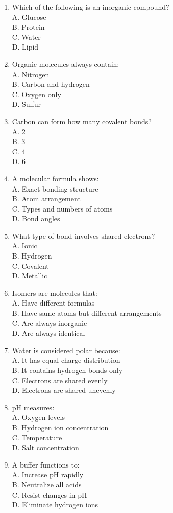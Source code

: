 \documentclass[
  letterpaper,
  DIV=11,
  numbers=noendperiod]{scrreprt}
\begin{document}
\begin{enumerate}
\def\labelenumi{\arabic{enumi}.}
\item
  Which of the following is an inorganic compound?\\
  A. Glucose\\
  B. Protein\\
  C. Water\\
  D. Lipid
\item
  Organic molecules always contain:\\
  A. Nitrogen\\
  B. Carbon and hydrogen\\
  C. Oxygen only\\
  D. Sulfur
\item
  Carbon can form how many covalent bonds?\\
  A. 2\\
  B. 3\\
  C. 4\\
  D. 6
\item
  A molecular formula shows:\\
  A. Exact bonding structure\\
  B. Atom arrangement\\
  C. Types and numbers of atoms\\
  D. Bond angles
\item
  What type of bond involves shared electrons?\\
  A. Ionic\\
  B. Hydrogen\\
  C. Covalent\\
  D. Metallic
\item
  Isomers are molecules that:\\
  A. Have different formulas\\
  B. Have same atoms but different arrangements\\
  C. Are always inorganic\\
  D. Are always identical
\item
  Water is considered polar because:\\
  A. It has equal charge distribution\\
  B. It contains hydrogen bonds only\\
  C. Electrons are shared evenly\\
  D. Electrons are shared unevenly
\item
  pH measures:\\
  A. Oxygen levels\\
  B. Hydrogen ion concentration\\
  C. Temperature\\
  D. Salt concentration
\item
  A buffer functions to:\\
  A. Increase pH rapidly\\
  B. Neutralize all acids\\
  C. Resist changes in pH\\
  D. Eliminate hydrogen ions
\end{enumerate}
\end{document}
